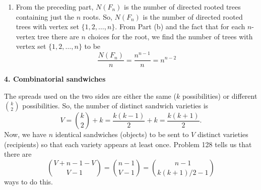 \documentclass[11pt]{article}
\newcommand{\f}[2]{\frac{#1}{#2}}
\begin{document}
\begin{enumerate}[(a)]
\begin{enumerate}[1.]
		\item From the preceding part, $N(F_n)$ is the number of directed rooted trees containing just the $n$ roots. So, $N(F_n)$ is the number of directed rooted trees with vertex set $\{1,2,\dots,n\}$. From Part (b) and the fact that for each $n$-vertex tree there are $n$ choices for the root, we find the number of trees with vertex set $\{1,2,\dots,n\}$ to be $$\frac{N(F_n)}{n} = \frac{n^{n-1}}{n} = \boxed{n^{n-2}}$$
		
	\end{enumerate}
\end{enumerate}
 





\newpage
\noindent \textbf{4. Combinatorial sandwiches}


The spreads used on the two sides are either the same ($k$ possibilities) or different $k\choose 2$ possibilities. So, the number of distinct sandwich varieties is 
\begin{equation*}
V = {k\choose 2} + k  = \f{k(k-1)}{2} + k = \f{k(k+1)}{2}.
\end{equation*}
Now, we have $n$ identical sandwiches (objects) to be sent to $V$ distinct varieties (recipients) so that each variety appears at least once. Problem 128 tells us that there are
\begin{equation*}
{{V+n-1-V}\choose{V-1}} = {{n-1}\choose{V-1}} = \boxed{{{n-1}\choose{k(k+1)/2-1}}}
\end{equation*}
ways to do this. 
\end{document}
